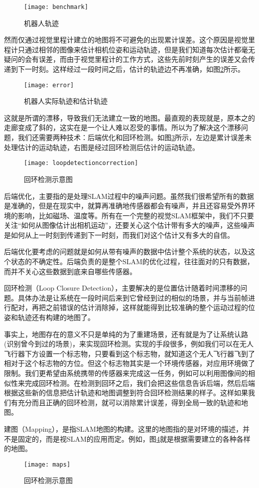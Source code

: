 \begin{figure}[H]
	\centering
	\texttt{[image: benchmark]}
	\caption{机器人轨迹}
	\label{fig:benchmark}
\end{figure}\par
然而仅通过视觉里程计建立的地图将不可避免的出现累计误差。这个原因是视觉里程计只通过相邻的图像来估计相机位姿和运动轨迹，但是我们知道每次估计都毫无疑问的会有误差，而由于视觉里程计的工作方式，这些先前时刻产生的误差又会传递到下一时刻。这样经过一段时间之后，估计的轨迹边不再准确，如图\ref{fig:error}所示。
\begin{figure}[H]
	\centering
	\texttt{[image: error]}
	\caption{机器人实际轨迹和估计轨迹}
	\label{fig:error}
\end{figure}\par
这就是所谓的漂移，导致我们无法建立一致的地图。最直观的表现就是，原本之的走廊变成了斜的，这实在是一个让人难以忍受的事情。所以为了解决这个漂移问题，我们还需要两种技术：后端优化和回环检测。如图\ref{fig:ldc}所示，左边是累计误差未处理估计的运动轨迹，右图是经过回环检测后估计的运动轨迹。
\begin{figure}[H]
	\centering
	\texttt{[image: loopdetectioncorrection]}
	\caption{回环检测示意图}
	\label{fig:ldc}
\end{figure}\par

后端优化，主要指的是处理SLAM过程中的噪声问题。虽然我们很希望所有的数据是准确的，但是在现实中，就算再准确地传感器都会有噪声，并且还容易受外界环境的影响，比如磁场、温度等。所有在一个完整的视觉SLAM框架中，我们不只要关注“如何从图像估计出相机运动”，还要关心这个估计带有多大的噪声，这些噪声是如何从上一时刻到传递到下一时刻，而我们对这个估计又有多大的自信。
\par
后端优化要考虑的问题就是如何从带有噪声的数据中估计整个系统的状态，以及这个状态的不确定性。后端负责的是整个SLAM的优化过程，往往面对的只有数据，而并不关心这些数据到底来自哪些传感器。
\par
回环检测（Loop Closure Detection），主要解决的是位置估计随着时间漂移的问题。具体办法是让系统在一段时间后来到它曾经到过的相似的场景，并与当前帧进行配对，再把之前错误的估计消除掉，这样就能得到比较准确的整个运动过程的位姿和轨迹还有构建的地图了。
\par
事实上，地图存在的意义不只是单纯的为了重建场景，还有就是为了让系统认路(识别曾今到过的场景)，来实现回环检测。实现的手段很多，例如我们可以在无人飞行器下方设置一个标志物，只要看到这个标志物，就知道这个无人飞行器飞到了相对于这个标志物的方位。但这个标志物其实是一个环境传感器，对应用环境做了限制。我们更希望由系统携带的传感器来完成这一任务，例如可以利用图像间的相似性来完成回环检测。在检测到回环之后，我们会把这些信息告诉后端，然后后端根据这些新的信息把估计轨迹和地图调整到符合回环检测结果的样子。这样如果我们有充分而且正确的回环检测，就可以消除累计误差，得到全局一致的轨迹和地图。\par
建图（Mapping），是指SLAM地图的构建。这里的地图指的是对环境的描述，并不是固定的，而是视SLAM的应用而定。例如，图\ref{fig:maps}就是根据需要建立的各种各样的地图。
\begin{figure}[H]
	\centering
	\texttt{[image: maps]}
	\caption{回环检测示意图}
	\label{fig:maps}
\end{figure}\par

